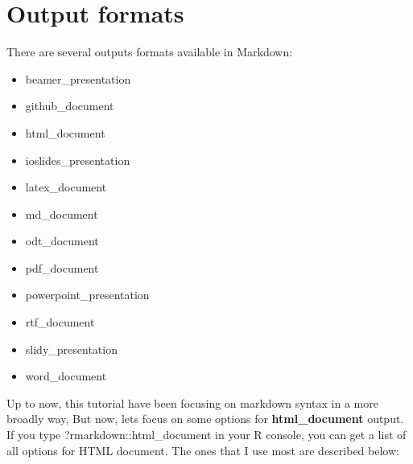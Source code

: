 \documentclass[]{article}
\providecommand{\tightlist}{%
  \setlength{\itemsep}{0pt}\setlength{\parskip}{0pt}}
\begin{document}
\section{Output formats}\label{output-formats}

There are several outputs formats available in Markdown:

\begin{itemize}
\tightlist
\item
  beamer\_presentation\\
\item
  github\_document\\
\item
  html\_document\\
\item
  ioslides\_presentation\\
\item
  latex\_document\\
\item
  md\_document\\
\item
  odt\_document\\
\item
  pdf\_document\\
\item
  powerpoint\_presentation\\
\item
  rtf\_document\\
\item
  slidy\_presentation\\
\item
  word\_document
\end{itemize}

Up to now, this tutorial have been focusing on markdown syntax in a more
broadly way, But now, lets focus on some options for
\textbf{html\_document} output.\\
If you type ?rmarkdown::html\_document in your R console, you can get a
list of all options for HTML document. The ones that I use most are
described below:
\end{document}
